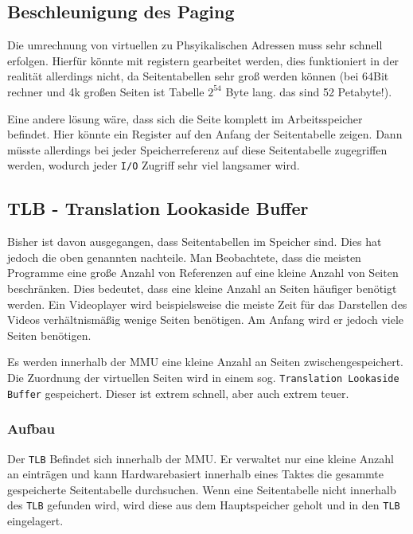 \subsection{Beschleunigung des Paging}

Die umrechnung von virtuellen zu Phsyikalischen Adressen muss sehr schnell
erfolgen. Hierfür könnte mit registern gearbeitet werden, dies funktioniert in
der realität allerdings nicht, da Seitentabellen sehr groß werden können (bei
64Bit rechner und 4k großen Seiten ist Tabelle $2^{54}$ Byte lang. das sind 52
Petabyte!).

Eine andere lösung wäre, dass sich die Seite komplett im Arbeitsspeicher
befindet. Hier könnte ein Register auf den Anfang der Seitentabelle zeigen.
Dann müsste allerdings bei jeder Speicherreferenz auf diese Seitentabelle
zugegriffen werden, wodurch jeder \texttt{I/O} Zugriff sehr viel langsamer
wird.

\subsection{TLB - Translation Lookaside Buffer}

Bisher ist davon ausgegangen, dass Seitentabellen im Speicher sind. Dies hat
jedoch die oben genannten nachteile. Man Beobachtete, dass die meisten
Programme eine große Anzahl von Referenzen auf eine kleine Anzahl von Seiten
beschränken. Dies bedeutet, dass eine kleine Anzahl an Seiten häufiger benötigt
werden. Ein Videoplayer wird beispielsweise die meiste Zeit für das Darstellen
des Videos verhältnismäßig wenige Seiten benötigen. Am Anfang wird er jedoch
viele Seiten benötigen.

Es werden innerhalb der MMU eine kleine Anzahl an Seiten zwischengespeichert.
Die Zuordnung der virtuellen Seiten wird in einem sog. \texttt{Translation
    Lookaside Buffer} gespeichert. Dieser ist extrem schnell, aber auch extrem
teuer.

\subsubsection{Aufbau}

Der \texttt{TLB} Befindet sich innerhalb der MMU. Er verwaltet nur eine kleine
Anzahl an einträgen und kann Hardwarebasiert innerhalb eines Taktes die
gesammte gespeicherte Seitentabelle durchsuchen. Wenn eine Seitentabelle nicht
innerhalb des \texttt{TLB} gefunden wird, wird diese aus dem Hauptspeicher
geholt und in den \texttt{TLB} eingelagert.

